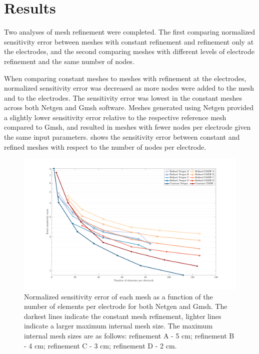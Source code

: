 \section{Results}

Two analyses of mesh refinement were completed. The first comparing normalized sensitivity error between
meshes with constant refinement and refinement only at the electrodes, and the second 
comparing meshes with different levels of electrode refinement and the same number of nodes.

When comparing constant meshes to meshes with refinement at the electrodes, normalized sensitivity error
was decreased as more nodes were added to the mesh and to the electrodes. The sensitivity
error was lowest in the constant meshes across both Netgen and Gmsh software. Meshes 
generated using Netgen
provided a slightly lower sensitivity error relative to the respective reference mesh
compared to Gmsh, and resulted in meshes with fewer nodes per electrode given the same input
parameters.  shows the sensitivity error between
constant and refined meshes with respect to the number of nodes per electrode.  

\begin{figure}
  \includegraphics[width=\columnwidth]{chapter4-mesh_refinement/imgs/sens_error_total.pdf}
  \caption[Mesh sensitivity error vs. elements per electrode]{\label{fig:results_sens_original} 
  Normalized sensitivity error of each mesh as a function 
  of the number of elements per electrode for both Netgen and Gmsh. The darkest lines indicate the
  constant mesh refinement, lighter lines indicate a larger maximum internal mesh size. The maximum
  internal mesh sizes are as follows: refinement A - 5 cm; refinement B - 4 cm; refinement C - 3 cm;
  refinement D - 2 cm.}
\end{figure}

